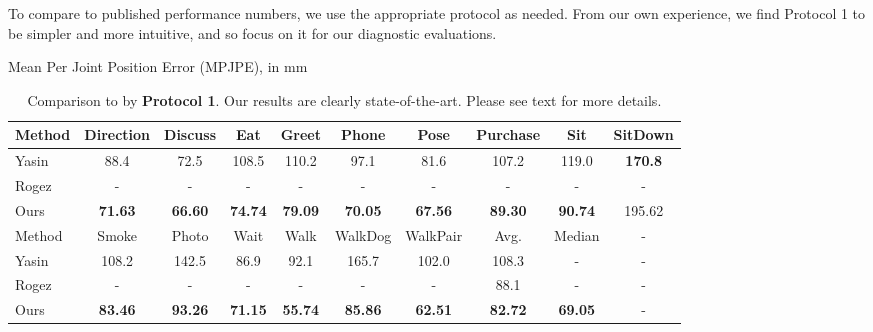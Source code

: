 \documentclass[10pt,twocolumn,letterpaper]{article}
\begin{document}
To compare to published performance numbers, we use the appropriate protocol as needed. From our own experience, we find Protocol 1 to be simpler and more intuitive, and so focus on it for our diagnostic evaluations.



\begin{table*}[t!]
\centering
Mean Per Joint Position Error (MPJPE), in mm\\
\begin{tabular}{|l|c|c|c|c|c|c|c|c|c|}
\hline
Method & Direction & Discuss & Eat & Greet & Phone & Pose & Purchase & Sit & SitDown\\
\hline
\hline
Yasin \cite{Yasin_2016_CVPR}& 88.4 & 72.5 & 108.5 & 110.2 & 97.1 & 81.6 & 107.2 & 119.0 & \textbf{170.8} \\
Rogez \cite{rogez2016mocap}& -&-&-&-&-&-&-&-&-\\
\hline
Ours &\textbf{71.63} &\textbf{66.60} &\textbf{74.74} &\textbf{79.09} &\textbf{70.05} &\textbf{67.56} &\textbf{89.30} &\textbf{90.74} &195.62 \\
\hline
\hline
Method & Smoke & Photo & Wait & Walk & WalkDog & WalkPair & Avg. & Median & -\\
\hline
\hline
Yasin \cite{Yasin_2016_CVPR}& 108.2 & 142.5 & 86.9 & 92.1 & 165.7 & 102.0 & 108.3 & - &-\\
Rogez \cite{rogez2016mocap}&-&-&-&-&-&-& 88.1 & - &-\\
\hline
Ours &\textbf{83.46} &\textbf{93.26} &\textbf{71.15} &\textbf{55.74} &\textbf{85.86} &\textbf{62.51}& \textbf{82.72} & \textbf{69.05}&-\\
\hline
\end{tabular}
\caption{Comparison to \cite{Yasin_2016_CVPR} by \textbf{Protocol 1}. Our results are clearly state-of-the-art. Please see text for more details.}
\label{table: s11_compare}
\end{table*}
\end{document}
